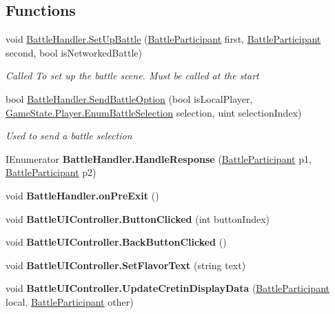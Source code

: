\subsection*{Functions}
\begin{DoxyCompactItemize}
\item 
void \hyperlink{group__client_ga380a371e96df1b362027a8f33c8ed7fb}{Battle\-Handler.\-Set\-Up\-Battle} (\hyperlink{class_battle_participant}{Battle\-Participant} first, \hyperlink{class_battle_participant}{Battle\-Participant} second, bool is\-Networked\-Battle)
\begin{DoxyCompactList}\small\item\em Called To set up the battle scene. Must be called at the start \end{DoxyCompactList}\item 
bool \hyperlink{group__client_gad207e2adf6f1f3882e98b1c8a5f59f67}{Battle\-Handler.\-Send\-Battle\-Option} (bool is\-Local\-Player, \hyperlink{class_game_state_1_1_player_a9f54c5eca1e60acbaa2074e981f51615}{Game\-State.\-Player.\-Enum\-Battle\-Selection} selection, uint selection\-Index)
\begin{DoxyCompactList}\small\item\em Used to send a battle selection \end{DoxyCompactList}\item 
\hypertarget{group__client_gad69bfcfc81caec50b1db97edb95e33b1}{I\-Enumerator {\bfseries Battle\-Handler.\-Handle\-Response} (\hyperlink{class_battle_participant}{Battle\-Participant} p1, \hyperlink{class_battle_participant}{Battle\-Participant} p2)}\label{group__client_gad69bfcfc81caec50b1db97edb95e33b1}

\item 
\hypertarget{group__client_ga13610e1414fd1f866292588574c96139}{void {\bfseries Battle\-Handler.\-on\-Pre\-Exit} ()}\label{group__client_ga13610e1414fd1f866292588574c96139}

\item 
\hypertarget{group__client_ga3a85307f98994f49ffcb122ad836895f}{void {\bfseries Battle\-U\-I\-Controller.\-Button\-Clicked} (int button\-Index)}\label{group__client_ga3a85307f98994f49ffcb122ad836895f}

\item 
\hypertarget{group__client_ga7cdd677370faa1526e0774b2b070e6fd}{void {\bfseries Battle\-U\-I\-Controller.\-Back\-Button\-Clicked} ()}\label{group__client_ga7cdd677370faa1526e0774b2b070e6fd}

\item 
\hypertarget{group__client_ga05427e5dab5da5027fd3f12526e7d98c}{void {\bfseries Battle\-U\-I\-Controller.\-Set\-Flavor\-Text} (string text)}\label{group__client_ga05427e5dab5da5027fd3f12526e7d98c}

\item 
\hypertarget{group__client_ga2e5edea6e65f3deca364e9750bd11e6f}{void {\bfseries Battle\-U\-I\-Controller.\-Update\-Cretin\-Display\-Data} (\hyperlink{class_battle_participant}{Battle\-Participant} local, \hyperlink{class_battle_participant}{Battle\-Participant} other)}\label{group__client_ga2e5edea6e65f3deca364e9750bd11e6f}

\end{DoxyCompactItemize}
